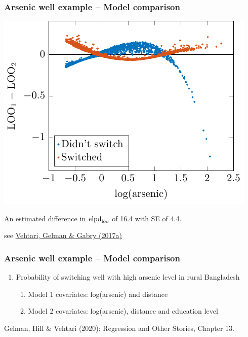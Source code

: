 \documentclass[10pt]{beamer}
\begin{document}
 \begin{frame}

 \frametitle{Arsenic well example -- Model comparison}


    \includegraphics[width=.8\textwidth]{figs/arsenic12d.pdf}

    An estimated difference in ${\rm elpd}_{\rm loo}$ of 16.4 with SE of 4.4.

 {\small see \href{http://link.springer.com/article/10.1007/s11222-016-9696-4}{Vehtari, Gelman \& Gabry (2017a)}}
\end{frame}

\begin{frame}{}

\frametitle{Arsenic well example -- Model comparison}

\begin{enumerate}
\item Probability of switching well with high arsenic level in rural Bangladesh
  \begin{enumerate}
    \item Model 1 covariates: log(arsenic) and distance
    \item Model 2 covariates: log(arsenic), distance and education level
  \end{enumerate}
\end{enumerate}

\vspace{10\baselineskip}
{\small Gelman, Hill \& Vehtari (2020): Regression and Other Stories, Chapter 13.}

\end{frame}
\end{document}
